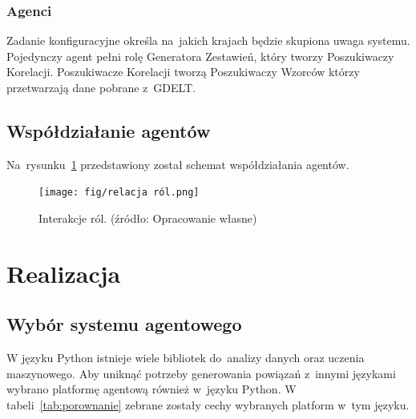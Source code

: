 \documentclass[11pt]{report}
\begin{document}
    \subsection{Agenci}
    Zadanie konfiguracyjne określa na~jakich krajach będzie skupiona uwaga systemu.
    Pojedynczy agent pełni rolę Generatora Zestawień, który tworzy Poszukiwaczy Korelacji.
    Poszukiwacze Korelacji tworzą Poszukiwaczy Wzorców którzy przetwarzają dane pobrane z~GDELT\@.


    \section{Współdziałanie agentów}
    Na~rysunku~\ref{fig:relacje} przedstawiony został schemat współdziałania agentów.

    \begin{figure}[!ht]
        \centering
        \texttt{[image: fig/relacja ról.png]}
        \caption{Interakcje ról. (źródło: Opracowanie własne)}
        \label{fig:relacje}
    \end{figure}


    \chapter{Realizacja}\label{ch:realizacja}


    \section{Wybór systemu agentowego}

    W języku Python istnieje wiele bibliotek do~analizy danych oraz uczenia maszynowego.
    Aby uniknąć potrzeby generowania powiązań z~innymi językami wybrano platformę agentową również w~języku Python.
    W tabeli~\ref{tab:porownanie} zebrane zostały cechy wybranych platform w~tym języku.
\end{document}

